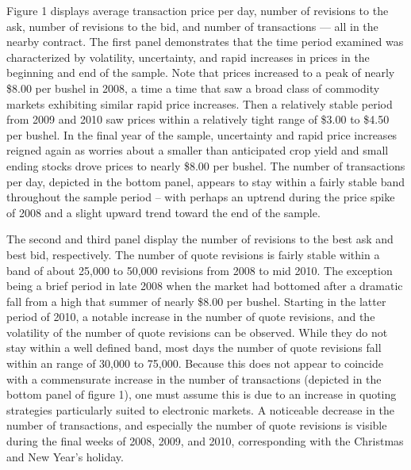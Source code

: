\documentclass[]{elsarticle} %
\begin{document}
Figure 1 displays average transaction price per day, number of revisions
to the ask, number of revisions to the bid, and number of transactions
--- all in the nearby contract. The first panel demonstrates that the
time period examined was characterized by volatility, uncertainty, and
rapid increases in prices in the beginning and end of the sample. Note
that prices increased to a peak of nearly \$8.00 per bushel in 2008, a
time a time that saw a broad class of commodity markets exhibiting
similar rapid price increases. Then a relatively stable period from 2009
and 2010 saw prices within a relatively tight range of \$3.00 to \$4.50
per bushel. In the final year of the sample, uncertainty and rapid price
increases reigned again as worries about a smaller than anticipated crop
yield and small ending stocks drove prices to nearly \$8.00 per bushel.
The number of transactions per day, depicted in the bottom panel,
appears to stay within a fairly stable band throughout the sample period
-- with perhaps an uptrend during the price spike of 2008 and a slight
upward trend toward the end of the sample.

The second and third panel display the number of revisions to the best
ask and best bid, respectively. The number of quote revisions is fairly
stable within a band of about 25,000 to 50,000 revisions from 2008 to
mid 2010. The exception being a brief period in late 2008 when the
market had bottomed after a dramatic fall from a high that summer of
nearly \$8.00 per bushel. Starting in the latter period of 2010, a
notable increase in the number of quote revisions, and the volatility of
the number of quote revisions can be observed. While they do not stay
within a well defined band, most days the number of quote revisions fall
within an range of 30,000 to 75,000. Because this does not appear to
coincide with a commensurate increase in the number of transactions
(depicted in the bottom panel of figure 1), one must assume this is due
to an increase in quoting strategies particularly suited to electronic
markets. A noticeable decrease in the number of transactions, and
especially the number of quote revisions is visible during the final
weeks of 2008, 2009, and 2010, corresponding with the Christmas and New
Year's holiday.
\end{document}
